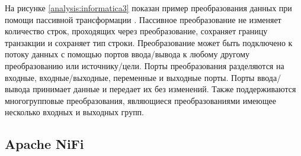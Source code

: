 \begin{figure}[ht!]
\end{figure}

На рисунке \ref{analysis:informatica3} показан пример преобразования данных при помощи пассивной трансформации \cite{bib15}. 
Пассивное преобразование не изменяет количество строк, проходящих через преобразование, сохраняет границу транзакции и сохраняет тип строки.
Преобразование может быть подключено к потоку данных с помощью портов ввода/вывода к любому другому преобразованию или источнику/цели.
Порты преобразования разделяются на  входные, входные/выходные, переменные и выходные порты. Порты ввода/вывода принимает данные и передает их без изменений.
Также поддерживаются многогрупповые преобразования, являющиеся преобразованиями 
имеющее несколько входных и выходных групп.

\begin{figure}[ht!]
\end{figure}

\newpage

\subsection{Apache NiFi}

